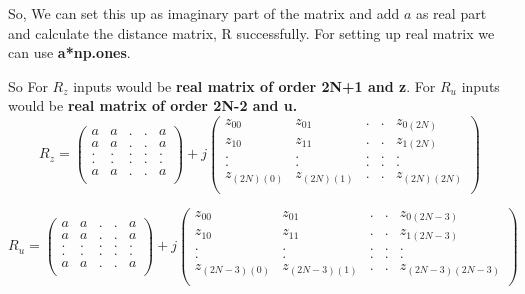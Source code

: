 \documentclass[12pt, a4paper]{report}
\begin{document}
 So, We can set this up as imaginary part of the matrix and add $a$ as real part and  calculate the distance matrix, R successfully.
 For setting up real matrix we can use \textbf{a*np.ones}.
 
 \newline
So For \textbf{$R_z$} inputs would be \textbf{real matrix of order 2N+1 and z}. For \textbf{$R_u$} inputs would be \textbf{real matrix of order 2N-2 and u.}
\begin{equation*}
R_z= 
  \begin{pmatrix}
    a&a& .&. &a\\
       a&a& .&. &a\\
        . &.& . &. &.\\
         . &.& . &. &.\\
              a&a& .&. &a\\
  \end{pmatrix}
 +j
  \begin{pmatrix}
  z_{00}& z_{01}& . &.& z_{0(2N)}\\
  z_{10}& z_{11}& . &.& z_{1(2N)}\\
  .& . &. &.& .\\
  . &.& .& . &.\\
 z_{(2N)(0)}& z_{(2N)(1)}& . &.& z_{(2N)(2N)}\\

    \end{pmatrix}


\end{equation*}

\begin{equation*}
R_u= 
  \begin{pmatrix}
    a&a& .&. &a\\
       a&a& .&. &a\\
        . &.& . &. &.\\
         . &.& . &. &.\\
              a&a& .&. &a\\
  \end{pmatrix}
 +j
  \begin{pmatrix}
  z_{00}& z_{01}& . &.& z_{0(2N-3)}\\
  z_{10}& z_{11}& . &.& z_{1(2N-3)}\\
  .& . &. &.& .\\
  . &.& .& . &.\\
 z_{(2N-3)(0)}& z_{(2N-3)(1)}& . &.& z_{(2N-3)(2N-3)}\\

    \end{pmatrix}


\end{equation*}
 
\end{document}
